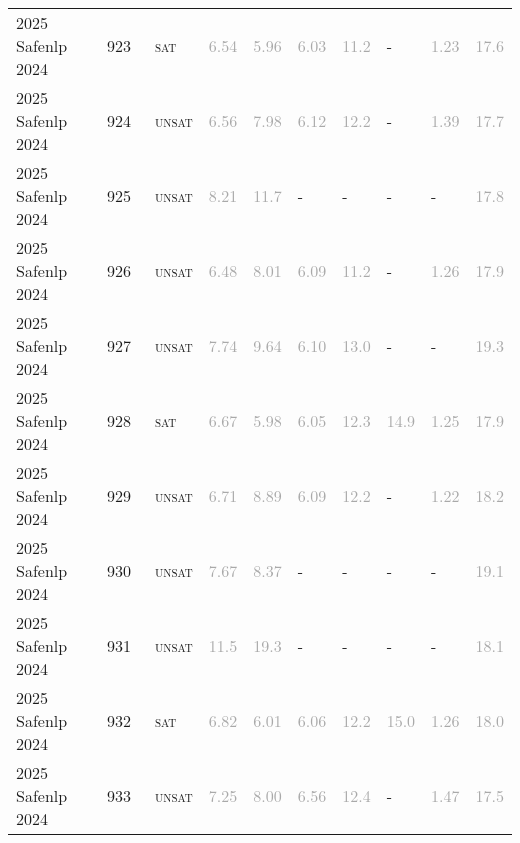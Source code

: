 \begin{center}
{\begin{longtable}{@{}llllllllll@{}}
2025 Safenlp 2024 & 923 & ~\textsc{sat} & \textcolor{darkgray}{6.54} & \textcolor{darkgray}{5.96} & \textcolor{darkgray}{6.03} & \textcolor{darkgray}{11.2} & - & \textcolor{darkgray}{1.23} & \textcolor{darkgray}{17.6} \\
2025 Safenlp 2024 & 924 & ~\textsc{unsat} & \textcolor{darkgray}{6.56} & \textcolor{darkgray}{7.98} & \textcolor{darkgray}{6.12} & \textcolor{darkgray}{12.2} & - & \textcolor{darkgray}{1.39} & \textcolor{darkgray}{17.7} \\
2025 Safenlp 2024 & 925 & ~\textsc{unsat} & \textcolor{darkgray}{8.21} & \textcolor{darkgray}{11.7} & - & - & - & - & \textcolor{darkgray}{17.8} \\
2025 Safenlp 2024 & 926 & ~\textsc{unsat} & \textcolor{darkgray}{6.48} & \textcolor{darkgray}{8.01} & \textcolor{darkgray}{6.09} & \textcolor{darkgray}{11.2} & - & \textcolor{darkgray}{1.26} & \textcolor{darkgray}{17.9} \\
2025 Safenlp 2024 & 927 & ~\textsc{unsat} & \textcolor{darkgray}{7.74} & \textcolor{darkgray}{9.64} & \textcolor{darkgray}{6.10} & \textcolor{darkgray}{13.0} & - & - & \textcolor{darkgray}{19.3} \\
2025 Safenlp 2024 & 928 & ~\textsc{sat} & \textcolor{darkgray}{6.67} & \textcolor{darkgray}{5.98} & \textcolor{darkgray}{6.05} & \textcolor{darkgray}{12.3} & \textcolor{darkgray}{14.9} & \textcolor{darkgray}{1.25} & \textcolor{darkgray}{17.9} \\
2025 Safenlp 2024 & 929 & ~\textsc{unsat} & \textcolor{darkgray}{6.71} & \textcolor{darkgray}{8.89} & \textcolor{darkgray}{6.09} & \textcolor{darkgray}{12.2} & - & \textcolor{darkgray}{1.22} & \textcolor{darkgray}{18.2} \\
2025 Safenlp 2024 & 930 & ~\textsc{unsat} & \textcolor{darkgray}{7.67} & \textcolor{darkgray}{8.37} & - & - & - & - & \textcolor{darkgray}{19.1} \\
2025 Safenlp 2024 & 931 & ~\textsc{unsat} & \textcolor{darkgray}{11.5} & \textcolor{darkgray}{19.3} & - & - & - & - & \textcolor{darkgray}{18.1} \\
2025 Safenlp 2024 & 932 & ~\textsc{sat} & \textcolor{darkgray}{6.82} & \textcolor{darkgray}{6.01} & \textcolor{darkgray}{6.06} & \textcolor{darkgray}{12.2} & \textcolor{darkgray}{15.0} & \textcolor{darkgray}{1.26} & \textcolor{darkgray}{18.0} \\
2025 Safenlp 2024 & 933 & ~\textsc{unsat} & \textcolor{darkgray}{7.25} & \textcolor{darkgray}{8.00} & \textcolor{darkgray}{6.56} & \textcolor{darkgray}{12.4} & - & \textcolor{darkgray}{1.47} & \textcolor{darkgray}{17.5} \\

\end{longtable}}
\end{center}
